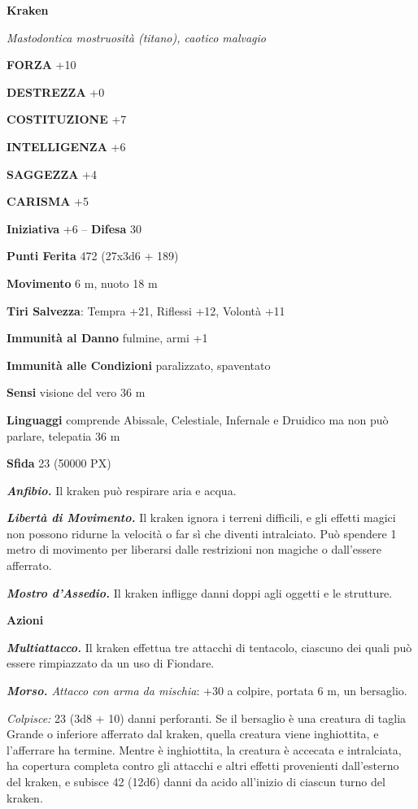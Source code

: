 \begin{multicols}{2}
	\medskip{}\textbf{Kraken}

	\textit{Mastodontica mostruosità (titano), caotico malvagio}

	\textbf{FORZA} +10

	\textbf{DESTREZZA} +0

	\textbf{COSTITUZIONE} +7

	\textbf{INTELLIGENZA} +6

	\textbf{SAGGEZZA} +4

	\textbf{CARISMA} +5

	\textbf{Iniziativa} +6 -- \textbf{Difesa} 30

	\textbf{Punti Ferita} 472 (27x3d6 + 189)

	\textbf{Movimento} 6 m, nuoto 18 m

	\textbf{Tiri Salvezza}: Tempra +21, Riflessi +12, Volontà +11

	\textbf{Immunità al Danno} fulmine, armi +1

	\textbf{Immunità alle Condizioni} paralizzato, spaventato

	\textbf{Sensi} visione del vero 36 m

	\textbf{Linguaggi} comprende Abissale, Celestiale, Infernale e Druidico ma non può parlare, telepatia 36 m

	\textbf{Sfida} 23 (50000 PX)

	\textit{\textbf{Anfibio.}} Il kraken può respirare aria e acqua.

	\textit{\textbf{Libertà di Movimento.}} Il kraken ignora i terreni difficili, e gli effetti magici non possono ridurne la velocità o far sì che diventi intralciato. Può spendere 1 metro di movimento per liberarsi dalle restrizioni non magiche o dall'essere afferrato.

	\textit{\textbf{Mostro d'Assedio.}} Il kraken infligge danni doppi agli oggetti e le strutture.

	\textbf{Azioni}

	\textit{\textbf{Multiattacco.}} Il kraken effettua tre attacchi di tentacolo, ciascuno dei quali può essere rimpiazzato da un uso di Fiondare.

	\textit{\textbf{Morso.} Attacco con arma da mischia}: +30 a colpire, portata 6 m, un bersaglio.

	\textit{Colpisce:} 23 (3d8 + 10) danni perforanti. Se il bersaglio è una creatura di taglia Grande o inferiore afferrato dal kraken, quella creatura viene inghiottita, e l'afferrare ha termine. Mentre è inghiottita, la creatura è accecata e intralciata, ha copertura completa contro gli attacchi e altri effetti provenienti dall'esterno del kraken, e subisce 42 (12d6) danni da acido all'inizio di ciascun turno del kraken.


\end{multicols}

